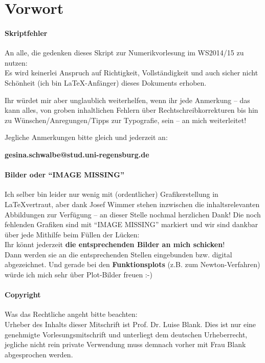 % 
% 
% 
% 


\chapter*{Vorwort}
\subsubsection{Skriptfehler}
An alle, die gedenken dieses Skript zur Numerikvorlesung im WS2014/15 zu 
nutzen:\\
Es wird keinerlei Anspruch auf Richtigkeit, Vollständigkeit und auch sicher nicht Schönheit
(ich bin \LaTeX-Anfänger) dieses Dokuments erhoben.

Ihr würdet mir aber unglaublich weiterhelfen, wenn ihr jede Anmerkung 
-- das kann alles, von groben inhaltlichen 
Fehlern über Rechtschreibkorrekturen bis hin zu Wünschen/Anregungen/Tipps zur Typografie, sein --
an mich weiterleitet!

Jegliche Anmerkungen bitte gleich und jederzeit an:
\begin{center}
  \textbf{\large
    gesina.schwalbe@stud.uni-regensburg.de}
\end{center}
\hspace{1cm}


\subsubsection{Bilder oder \enquote{IMAGE MISSING}}
Ich selber bin leider nur wenig mit (ordentlicher) Grafikerstellung in
\LaTeX vertraut,
aber dank Josef Wimmer stehen inzwischen die inhaltsrelevanten
Abbildungen zur Verfügung
-- an dieser Stelle nochmal herzlichen Dank!
Die noch fehlenden Grafiken sind mit \enquote{IMAGE MISSING} markiert und
wir sind dankbar über jede Mithilfe beim Füllen der Lücken:\\
Ihr könnt jederzeit \textbf{die entsprechenden Bilder an mich schicken}!\\
Dann werden sie an die entsprechenden Stellen eingebunden
bzw. digital abgezeichnet.
Und gerade bei den \textbf{Funktionsplots} (z.B. zum Newton-Verfahren)
würde ich mich sehr über Plot-Bilder freuen :-)


\subsubsection{Copyright}
Was das Rechtliche angeht bitte beachten: \\
Urheber des Inhalts dieser Mitschrift ist Prof. Dr. Luise Blank.
Dies ist nur eine genehmigte Vorlesungsmitschrift und unterliegt dem deutschen
Urheberrecht, jegliche nicht rein private Verwendung muss demnach vorher mit
Frau Blank abgesprochen werden.


